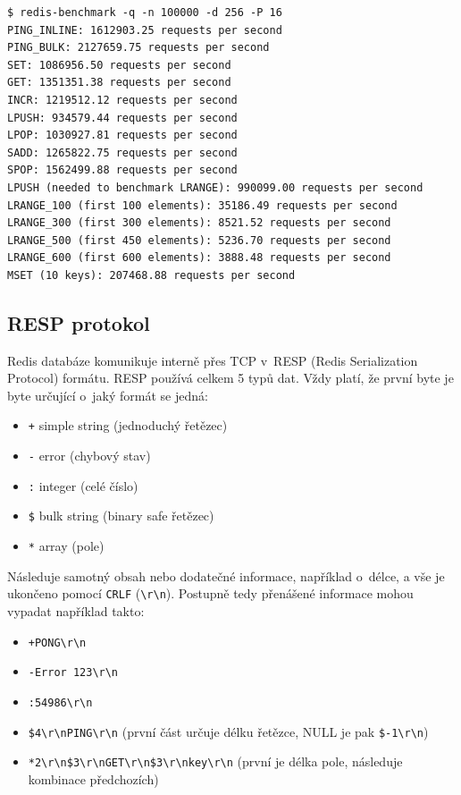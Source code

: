 \begin{verbatim}
$ redis-benchmark -q -n 100000 -d 256 -P 16
PING_INLINE: 1612903.25 requests per second
PING_BULK: 2127659.75 requests per second
SET: 1086956.50 requests per second
GET: 1351351.38 requests per second
INCR: 1219512.12 requests per second
LPUSH: 934579.44 requests per second
LPOP: 1030927.81 requests per second
SADD: 1265822.75 requests per second
SPOP: 1562499.88 requests per second
LPUSH (needed to benchmark LRANGE): 990099.00 requests per second
LRANGE_100 (first 100 elements): 35186.49 requests per second
LRANGE_300 (first 300 elements): 8521.52 requests per second
LRANGE_500 (first 450 elements): 5236.70 requests per second
LRANGE_600 (first 600 elements): 3888.48 requests per second
MSET (10 keys): 207468.88 requests per second
\end{verbatim}


\subsection{RESP protokol}
Redis databáze komunikuje interně přes TCP  v~RESP  (Redis Serialization Protocol) formátu. RESP používá celkem 5 typů dat. Vždy platí, že první byte je byte určující o~jaký formát se jedná:

\begin{itemize}
\itemsep0em
\item \texttt{+} simple string (jednoduchý řetězec)
\item \texttt{-} error (chybový stav)
\item \texttt{:} integer (celé číslo)
\item \texttt{\$} bulk string (binary safe řetězec)
\item \texttt{*} array (pole)
\end{itemize}

Následuje samotný obsah nebo dodatečné informace, například o~délce, a vše je ukončeno pomocí \texttt{CRLF} (\texttt{\textbackslash r\textbackslash n}). Postupně tedy přenášené informace mohou vypadat například takto:

\begin{itemize}
\itemsep0em
\item \texttt{+PONG\textbackslash r\textbackslash n}
\item \texttt{-Error 123\textbackslash r\textbackslash n}
\item \texttt{:54986\textbackslash r\textbackslash n}
\item \texttt{\$4\textbackslash r\textbackslash nPING\textbackslash r\textbackslash n} (první část určuje délku řetězce, NULL je pak \texttt{\$-1\textbackslash r\textbackslash n})
\item \texttt{*2\textbackslash r\textbackslash n\$3\textbackslash r\textbackslash nGET\textbackslash r\textbackslash n\$3\textbackslash r\textbackslash nkey\textbackslash r\textbackslash n} (první je délka pole, následuje kombinace předchozích)
\end{itemize}

